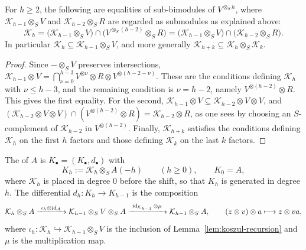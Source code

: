 \begin{lemma}\label{lem:koszul-recursion}
For $h\geq2$, the following are equalities of sub-bimodules of $V^{\otimes_Sh}$, where $\mathcal K_{h-1}\otimes_SV$ and $\mathcal K_{h-2}\otimes_SR$ are regarded as submodules as explained above:
\[
\mathcal K_h=\bigl(\mathcal K_{h-1}\otimes_SV\bigr)\cap\bigl(V^{\otimes_S(h-2)}\otimes_SR\bigr)=\bigl(\mathcal K_{h-1}\otimes_SV\bigr)\cap\bigl(\mathcal K_{h-2}\otimes_SR\bigr).
\]
In particular $\mathcal K_h\subseteq\mathcal K_{h-1}\otimes_SV$, and more generally $\mathcal K_{h+k}\subseteq\mathcal K_h\otimes_S\mathcal K_k$.
\end{lemma}

\begin{supplementary}
\begin{proof}
Since $-\otimes_SV$ preserves intersections, $\mathcal K_{h-1}\otimes V=\bigcap_{\nu=0}^{h-3}V^{\otimes\nu}\otimes R\otimes V^{\otimes(h-2-\nu)}$.
These are the conditions defining $\mathcal K_h$ with $\nu\leq h-3$, and the remaining condition is $\nu=h-2$, namely $V^{\otimes(h-2)}\otimes R$.
This gives the first equality.
For the second, $\mathcal K_{h-1}\otimes V\subseteq\mathcal K_{h-2}\otimes V\otimes V$, and $(\mathcal K_{h-2}\otimes V\otimes V)\cap(V^{\otimes(h-2)}\otimes R)=\mathcal K_{h-2}\otimes R$, as one sees by choosing an $S$-complement of $\mathcal K_{h-2}$ in $V^{\otimes(h-2)}$.
Finally, $\mathcal K_{h+k}$ satisfies the conditions defining $\mathcal K_h$ on the first $h$ factors and those defining $\mathcal K_k$ on the last $k$ factors.
\end{proof}
\end{supplementary}

\begin{definition}\label{def:koszul-complex}
The  of $A$ is $K_\bullet=(K_\bullet,d_\bullet)$ with
\[
K_h:=\mathcal K_h\otimes_SA(-h)\qquad(h\geq0),\qquad K_0=A,
\]
where $\mathcal K_h$ is placed in degree $0$ before the shift, so that $K_h$ is generated in degree $h$.
The differential $d_h:K_h\to K_{h-1}$ is the composition
\[
\mathcal K_h\otimes_SA\xrightarrow{\ \iota_h\otimes\id_A\ }\mathcal K_{h-1}\otimes_SV\otimes_SA\xrightarrow{\ \id_{\mathcal{K}_{h-1}}\otimes\mu\  }\mathcal K_{h-1}\otimes_SA,
\qquad
(z\otimes v)\otimes a\longmapsto z\otimes va,
\]
where $\iota_h:\mathcal K_h\hookrightarrow\mathcal K_{h-1}\otimes_SV$ is the inclusion of Lemma~\ref{lem:koszul-recursion} and $\mu$ is the multiplication map. 
\end{definition}

